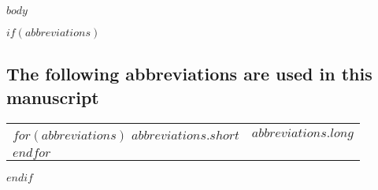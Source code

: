 \documentclass[preprint,11pt,5p]{elsarticle}
\begin{document}
$body$

$if(abbreviations)$
\subsection*{The following abbreviations are used in this manuscript}

\noindent
\begin{tabular}{@{}lp{}}
$for(abbreviations)$
$abbreviations.short$ & $abbreviations.long$ \\
$endfor$
\end{tabular}
$endif$
\end{document}
